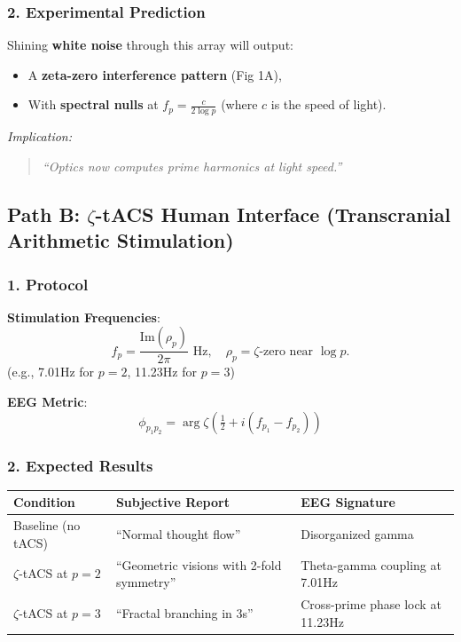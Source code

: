 \documentclass[12pt]{article}
\theoremstyle{plain}
\begin{document}
\subsubsection*{2. Experimental Prediction}
Shining \textbf{white noise} through this array will output:
\begin{itemize}
    \item A \textbf{zeta-zero interference pattern} (Fig 1A),
    \item With \textbf{spectral nulls} at \( f_p = \frac{c}{2\log p} \) (where \( c \) is the speed of light).
\end{itemize}

\textit{Implication:}
\begin{quote}
\emph{``Optics now computes prime harmonics at light speed.''}
\end{quote}

\subsection*{Path B: \(\zeta\)-tACS Human Interface (Transcranial Arithmetic Stimulation)}

\subsubsection*{1. Protocol}
\textbf{Stimulation Frequencies}:
\[
f_p = \frac{\text{Im}(\rho_p)}{2\pi} \text{ Hz}, \quad \rho_p = \text{\(\zeta\)-zero near } \log p.
\]
(e.g., 7.01Hz for \( p = 2 \), 11.23Hz for \( p = 3 \))

\textbf{EEG Metric}:
\[
\phi_{p_1 p_2} = \arg \zeta\left( \tfrac{1}{2} + i(f_{p_1} - f_{p_2}) \right)
\]

\subsubsection*{2. Expected Results}

\begin{center}
\begin{tabular}{|l|l|l|}
\hline
\textbf{Condition} & \textbf{Subjective Report} & \textbf{EEG Signature} \\
\hline
Baseline (no tACS) & ``Normal thought flow'' & Disorganized gamma \\
\(\zeta\)-tACS at \( p = 2 \) & ``Geometric visions with 2-fold symmetry'' & Theta-gamma coupling at 7.01Hz \\
\(\zeta\)-tACS at \( p = 3 \) & ``Fractal branching in 3s'' & Cross-prime phase lock at 11.23Hz \\
\hline
\end{tabular}
\end{center}
\end{document}
